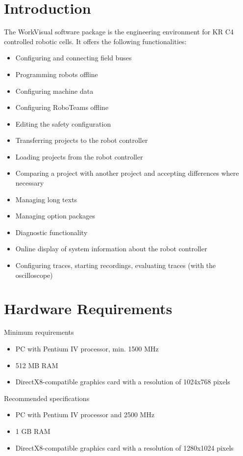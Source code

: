 	\section{Introduction}
	The WorkVisual software package is the engineering environment for KR C4 controlled robotic cells. It offers the following functionalities:

	\begin{itemize}
		\item Configuring and connecting field buses
		\item Programming robots offline
		\item Configuring machine data
		\item Configuring RoboTeams offline
		\item Editing the safety configuration
		\item Transferring projects to the robot controller
		\item Loading projects from the robot controller
		\item Comparing a project with another project and accepting differences where necessary
		\item Managing long texts
		\item Managing option packages
		\item Diagnostic functionality
		\item Online display of system information about the robot controller
		\item Configuring traces, starting recordings, evaluating traces (with the oscilloscope)
		
	\end{itemize}

	\section{Hardware Requirements}
	Minimum requirements
	\begin{itemize}
		\item PC with Pentium IV processor, min. 1500 MHz
		\item 512 MB RAM
		\item DirectX8-compatible graphics card with a resolution of 1024x768 pixels
	\end{itemize}
	Recommended specifications
	\begin{itemize}
		\item PC with Pentium IV processor and 2500 MHz
		\item 1 GB RAM
		\item DirectX8-compatible graphics card with a resolution of 1280x1024 pixels
	\end{itemize}
	

